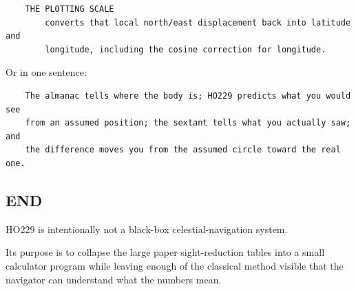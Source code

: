 \documentclass[11pt]{article}
\begin{document}
\begin{verbatim}
    THE PLOTTING SCALE
        converts that local north/east displacement back into latitude and
        longitude, including the cosine correction for longitude.
\end{verbatim}

Or in one sentence:

\begin{verbatim}
    The almanac tells where the body is; HO229 predicts what you would see
    from an assumed position; the sextant tells what you actually saw; and
    the difference moves you from the assumed circle toward the real one.
\end{verbatim}

\subsection*{END}

HO229 is intentionally not a black-box celestial-navigation system.

Its purpose is to collapse the large paper sight-reduction tables into a small calculator program while leaving enough of the classical method visible that the navigator can understand what the numbers mean.
\end{document}
